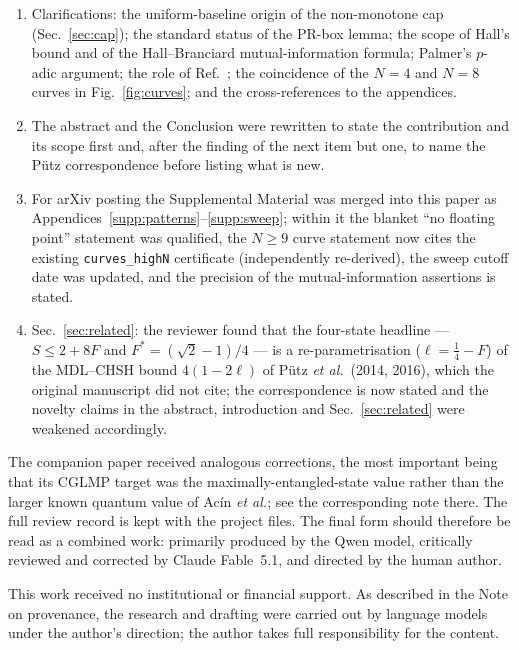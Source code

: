 \documentclass[aps,pra,reprint,superscriptaddress,floatfix]{revtex4-2}
\begin{document}
\begin{enumerate}
\item Clarifications: the uniform-baseline origin of the non-monotone cap
  (Sec.~\ref{sec:cap}); the standard status of the PR-box lemma; the scope
  of Hall's bound and of the Hall--Branciard mutual-information formula;
  Palmer's $p$-adic argument; the role of Ref.~; the
  coincidence of the $N=4$ and $N=8$ curves in Fig.~\ref{fig:curves}; and
  the cross-references to the appendices.
\item The abstract and the Conclusion were rewritten to state the
  contribution and its scope first and, after the finding of the next item
  but one, to name the P\"utz correspondence before listing what is new.
\item For arXiv posting the Supplemental Material was merged into this
  paper as Appendices~\ref{supp:patterns}--\ref{supp:sweep}; within it the
  blanket ``no floating point'' statement was qualified, the $N\ge9$
  curve statement now cites the existing \texttt{curves\_highN}
  certificate (independently re-derived), the sweep cutoff date was
  updated, and the precision of the mutual-information assertions is
  stated.
\item Sec.~\ref{sec:related}: the reviewer found that the four-state
  headline --- $S\le2+8F$ and $F^*=(\sqrt2-1)/4$ --- is a
  re-parametrisation ($\ell=\tfrac14-F$) of the MDL--CHSH bound
  $4(1-2\ell)$ of P\"utz \emph{et al.}\ (2014, 2016), which the original
  manuscript did not cite; the correspondence is now stated and the
  novelty claims in the abstract, introduction and Sec.~\ref{sec:related}
  were weakened accordingly.
\end{enumerate}
The companion paper received analogous corrections, the most important
being that its CGLMP target was the maximally-entangled-state value rather
than the larger known quantum value of Ac\'in \emph{et al.}; see the
corresponding note there. The full review record is kept with the project
files. The final form should therefore be read as a combined work:
primarily produced by the Qwen model, critically reviewed and corrected by
Claude Fable~5.1, and directed by the human author.

\begin{acknowledgments}
This work received no institutional or financial support. As described in
the Note on provenance, the research and drafting were carried out by
language models under the author's direction; the author takes full
responsibility for the content.
\end{acknowledgments}
\end{document}
